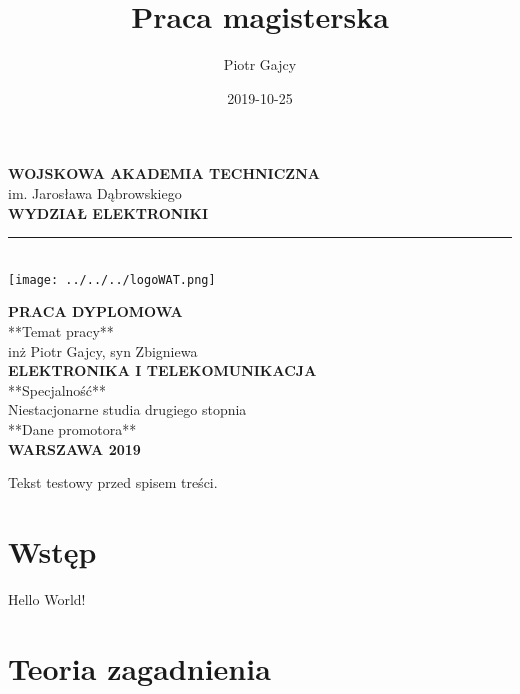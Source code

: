 \documentclass[a4paper, 12pt, twoside, openright]{report}
\title{Praca magisterska}
\date{2019-10-25}
\author{Piotr Gajcy}
\begin{document}
\begin{titlepage}
	\centering
	{\large \textbf{WOJSKOWA AKADEMIA TECHNICZNA}} \\
	{\large im. Jarosława Dąbrowskiego} \\
	{\large \textbf{WYDZIAŁ ELEKTRONIKI}} \\
	\noindent\rule{\textwidth}{4pt} \\
	\vspace{10pt}
	\texttt{[image: ../../../logoWAT.png]}\par\vspace{1cm}
	\vspace{20pt}
	{\LARGE \textbf{PRACA DYPLOMOWA}} \\
	\vspace{20pt}
	**Temat pracy** \\ 
	\vspace{10pt}
	inż Piotr Gajcy, syn Zbigniewa	\\ 
	\vspace{10pt}
	{\large \textbf{ELEKTRONIKA I TELEKOMUNIKACJA}} \\ 
	\vspace{10pt}
	**Specjalność** \\ 
	\vspace{10pt}
	Niestacjonarne studia drugiego stopnia \\ 
	\vspace{10pt}
	**Dane promotora** \\ 
	
	\vspace*{\fill}
	{\large \textbf{WARSZAWA 2019}}
	
\end{titlepage}
\newpage
  
Tekst testowy przed spisem treści.
  
\tableofcontents
\newpage
    
\chapter*{Wstęp}
Hello World!

\chapter{Teoria zagadnienia}
 
\end{document}
